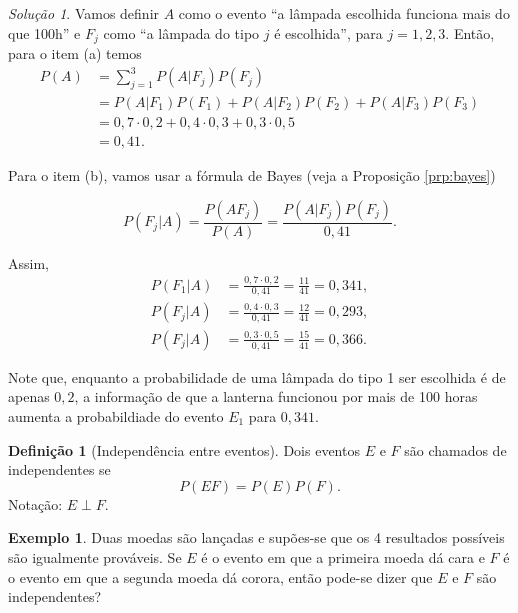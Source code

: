 \documentclass[]{book}
\theoremstyle{definition}
\newtheorem{definition}{Definição}[chapter]
\theoremstyle{definition}
\newtheorem{example}{Exemplo}[chapter]
\theoremstyle{definition}
\theoremstyle{remark}
\newtheorem*{solution}{Solução}
\begin{document}
\begin{solution}
\iffalse{} {Solução. } \fi{}Vamos definir \(A\) como o evento ``a lâmpada escolhida funciona mais do que 100h'' e \(F_j\) como ``a lâmpada do tipo \(j\) é escolhida'', para \(j=1,2,3\).
Então, para o item (a) temos
\begin{align}
P(A) & = \sum_{j=1}^{3}P(A|F_j)P(F_j)\\
& = P(A|F_1)P(F_1) + P(A|F_2)P(F_2) + P(A|F_3)P(F_3)\\
& = 0{,}7\cdot 0{,}2 + 0{,}4\cdot 0{,}3 + 0{,}3\cdot 0{,}5\\
&= 0{,}41.
\end{align}

Para o item (b), vamos usar a fórmula de Bayes (veja a Proposição \ref{prp:bayes})

\[P(F_j|A) = 
  \frac{P(AF_j)}{P(A)} = \frac{P(A|F_j)P(F_j)}{0{,}41}.\]

Assim,
\begin{align}
P(F_1|A) &= 
  \frac{0{,}7\cdot 0{,}2}{0{,}41} = \frac{11}{41} = 0{,}341, \\
P(F_j|A) &= 
  \frac{0{,}4\cdot 0{,}3}{0{,}41} = \frac{12}{41} = 0{,}293, \\
P(F_j|A) &= 
  \frac{0{,}3\cdot 0{,}5}{0{,}41} = \frac{15}{41} = 0{,}366.
\end{align}

Note que, enquanto a probabilidade de uma lâmpada do tipo 1 ser escolhida é de apenas \(0{,}2\), a informação de que a lanterna funcionou por mais de 100 horas aumenta a probabildiade do evento \(E_1\) para \(0{,}341\).
\end{solution}

\begin{definition}[Independência entre eventos]
\protect\hypertarget{def:defIndep}{}{\label{def:defIndep} \iffalse (Independência entre eventos) \fi{} }Dois eventos \(E\) e \(F\) são chamados de independentes se
\[P(EF) = P(E)P(F).\]
Notação: \(E\perp F\).
\end{definition}

\begin{example}
\protect\hypertarget{exm:unnamed-chunk-129}{}{\label{exm:unnamed-chunk-129} }Duas moedas são lançadas e supões-se que os 4 resultados possíveis são igualmente prováveis.
Se \(E\) é o evento em que a primeira moeda dá cara e \(F\) é o evento em que a segunda moeda dá corora, então pode-se dizer que \(E\) e \(F\) são independentes?
\end{example}
\end{document}
